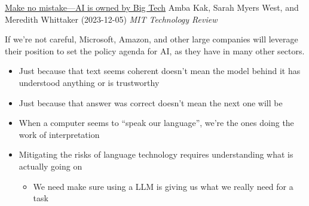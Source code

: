 \documentclass[25pt,a4paper,landscape,headrule,footrule,xetex]{foils}
\let\oldbibliography
\renewcommand{}[1]{
  \begingroup
  \renewcommand{\section}[2]{} %
  \oldbibliography{#1} %
  \endgroup
}
\begin{document}
\href{https://www.technologyreview.com/2023/12/05/1084393/make-no-mistake-ai-is-owned-by-big-tech/amp/}{Make no mistake—AI is owned by Big Tech}  Amba Kak, Sarah Myers West, and Meredith Whittaker (2023-12-05) \textit{MIT Technology Review}

If we’re not careful, Microsoft, Amazon, and other large companies will leverage their position to set the policy agenda for AI, as they have in many other sectors.





\begin{itemize}
\item  Just because that text seems coherent doesn’t mean the model behind it has
understood anything or is trustworthy
\item  Just because that answer was correct doesn’t mean the next one will be
\item  When a computer seems to “speak our language”, we’re the ones
doing the work of interpretation
\item Mitigating the risks of language technology requires understanding what is actually going on
  \begin{itemize}
  \item We need make sure using a LLM is giving us what we really need for a task
  \end{itemize}
\end{itemize}




\end{document}
